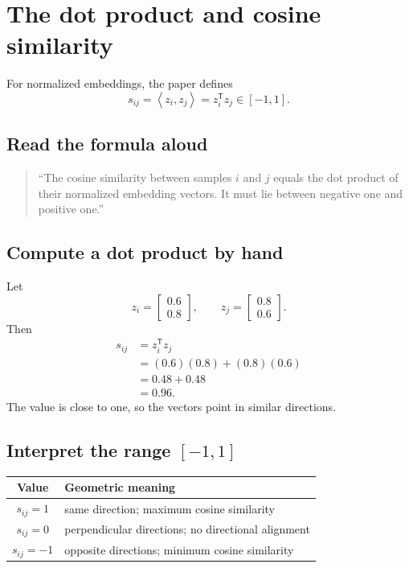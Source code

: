 \documentclass[11pt,oneside,openany]{book}
\theoremstyle{myplain}
\theoremstyle{definition}
\newcommand{\inner}[2]{\left\langle #1,#2\right\rangle}
\begin{document}
\section{The dot product and cosine similarity}

For normalized embeddings, the paper defines
\begin{equation}
  s_{ij}=\inner{z_i}{z_j}=z_i^{\mathsf T}z_j\in[-1,1].
  \label{eq:cosine}
\end{equation}

\subsection{Read the formula aloud}

\begin{quote}
``The cosine similarity between samples $i$ and $j$ equals the dot product of their normalized embedding vectors. It must lie between negative one and positive one.''
\end{quote}

\subsection{Compute a dot product by hand}

Let
\[
  z_i=\begin{bmatrix}0.6\\0.8\end{bmatrix},
  \qquad
  z_j=\begin{bmatrix}0.8\\0.6\end{bmatrix}.
\]
Then
\begin{align*}
  s_{ij}
  &=z_i^{\mathsf T}z_j\\
  &=(0.6)(0.8)+(0.8)(0.6)\\
  &=0.48+0.48\\
  &=0.96.
\end{align*}
The value is close to one, so the vectors point in similar directions.

\subsection{Interpret the range $[-1,1]$}

\begin{center}
\begin{tabularx}{0.88\textwidth}{c X}
\toprule
Value & Geometric meaning \\
\midrule
$s_{ij}=1$ & same direction; maximum cosine similarity \\
$s_{ij}=0$ & perpendicular directions; no directional alignment \\
$s_{ij}=-1$ & opposite directions; minimum cosine similarity \\
\bottomrule
\end{tabularx}
\end{center}
\end{document}
